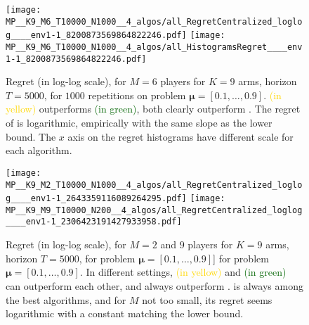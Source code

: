 \begin{figure}[!b]
  \centering
    \texttt{[image: MP\_\_K9\_M6\_T10000\_N1000\_\_4\_algos/all\_RegretCentralized\_loglog\_\_\_\_env1-1\_8200873569864822246.pdf]}
    \texttt{[image: MP\_\_K9\_M6\_T10000\_N1000\_\_4\_algos/all\_HistogramsRegret\_\_\_\_env1-1\_8200873569864822246.pdf]}
  \caption[Regret for $M=6$ players for $K=9$ arms, horizon $T=5000$, for $1000$ repetitions on a fixed problem.]{Regret (in log-log scale), for $M=6$ players for $K=9$ arms, horizon $T=5000$, for $1000$ repetitions on problem $\boldsymbol{\mu}=[0.1,\dots,0.9]$. \textcolor{gold}{\RandTopM{} (in yellow)} outperforms \textcolor{darkgreen}{\Selfish{} (in green)}, both clearly outperform \rhoRand. The regret of \MCTopM{} is logarithmic, empirically with the same slope as the lower bound. The $x$ axis on the regret histograms have different scale for each algorithm.}
  \label{fig:5:MP__K9_M6_T10000_N1000__4_algos}
\end{figure}


\begin{figure}[!t]
  \centering
      \texttt{[image: MP\_\_K9\_M2\_T10000\_N1000\_\_4\_algos/all\_RegretCentralized\_loglog\_\_\_\_env1-1\_2643359116089264295.pdf]}
      \texttt{[image: MP\_\_K9\_M9\_T10000\_N200\_\_4\_algos/all\_RegretCentralized\_loglog\_\_\_\_env1-1\_2306423191427933958.pdf]}
  \caption[Regret for $M=2$ and $9$ players for $K=9$ arms, horizon $T=5000$, for a fixed problem.]{Regret (in log-log scale), for $M=2$ and $9$ players for $K=9$ arms, horizon $T=5000$, for problem $\boldsymbol{\mu}=[0.1,\dots,0.9]$] for problem $\boldsymbol{\mu}=[0.1,\dots,0.9]$. In different settings, \textcolor{gold}{\RandTopM{} (in yellow)} and \textcolor{darkgreen}{\Selfish{} (in green)} can outperform each other, and always outperform \rhoRand. \MCTopM{} is always among the best algorithms, and for $M$ not too small, its regret seems logarithmic with a constant matching the lower bound.}
  \label{fig:5:MP__K9_M2-6-9_T10000_N200__4_algos}
\end{figure}


